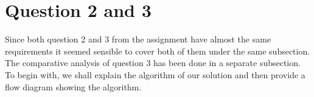 \documentclass[
11pt, %
english, %
singlespacing, %
parskip, %
headsepline, %
]{report} %
\begin{document}
	\section{Question 2 and 3}
	Since both question 2 and 3 from the assignment have almost the same requirements it seemed sensible to cover both of them under the same subsection. The comparative analysis of question 3 has been done in a separate subsection. To begin with, we shall explain the algorithm of our solution and then provide a flow diagram showing the algorithm.





\end{document}
